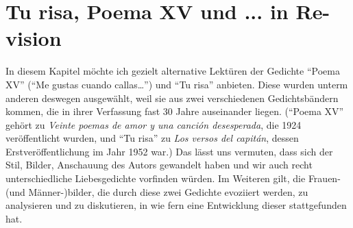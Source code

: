 \section{Tu risa, Poema XV und ... in Re-vision}


In diesem Kapitel möchte ich gezielt alternative Lektüren der Gedichte ``Poema XV'' (``Me gustas cuando callas\ldots'') und ``Tu risa'' anbieten. 
Diese wurden unterm anderen deswegen ausgewählt, weil sie aus zwei verschiedenen Gedichtsbändern kommen, die in ihrer Verfassung fast 30 Jahre auseinander liegen.
(``Poema XV'' gehört zu \textit{Veinte poemas de amor y una canción desesperada}, die 1924 veröffentlicht wurden, und ``Tu risa'' zu \textit{Los versos del capitán}, dessen Erstveröffentlichung im Jahr 1952 war.)
Das lässt uns vermuten, dass sich der Stil, Bilder, Anschauung des Autors gewandelt haben und wir auch recht unterschiedliche Liebesgedichte vorfinden würden.
Im Weiteren gilt, die Frauen- (und Männer-)bilder, die durch diese zwei Gedichte evoziiert werden, zu analysieren und zu diskutieren, in wie fern eine Entwicklung dieser stattgefunden hat.

